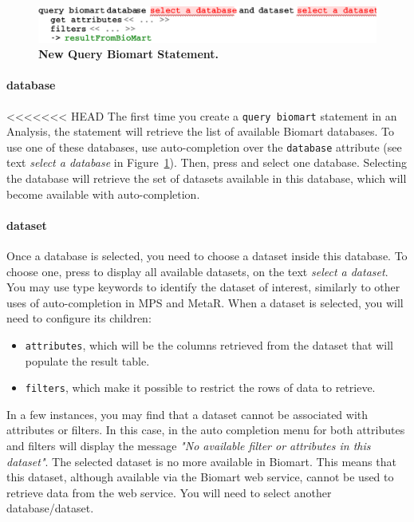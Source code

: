 \begin{itemize}
 \begin{figure}[h!tbp]
  \centering
  \includegraphics[width=\figWidthWide]{figures/NewBiomart.pdf}
\caption[New Query Biomart Statement.]{\textbf{New Query Biomart Statement.}}
\label{fig:NewBiomart}
\end{figure}


\paragraph{database}
<<<<<<< HEAD
The first time you create a \texttt{query biomart} statement in an Analysis, the statement will retrieve the list of available Biomart databases. To use one of these databases, use auto-completion over the \texttt{database} attribute (see  text \textit{select a database} in Figure~\ref{fig:NewBiomart}). Then, press \keys{\ctrl+\space} and select one database. Selecting the database will retrieve the set of datasets available in this database, which will become available with auto-completion.


 \paragraph{dataset} 
Once a database is selected, you need to choose a dataset inside this database. To choose one, press \keys{\ctrl+\space} to display all available datasets, on the text \textit{select a dataset}. You may use type keywords to identify the dataset of interest, similarly to other uses of auto-completion in MPS and MetaR. When a dataset is selected, you will need to configure its children:
\begin{itemize}

\item \texttt{attributes}, which will be the columns retrieved from the dataset that will populate the result table.
\item \texttt{filters}, which make it possible  to restrict the rows of data to retrieve.
\end{itemize}

\begin{remark}
In a few instances, you may find that a dataset cannot be associated with attributes or filters. In this case, in the auto completion menu for both attributes and filters will display the message \textit{"No available filter or attributes in this dataset"}. The selected dataset is no more available in Biomart. This means that this dataset, although available via the Biomart web service, cannot be used to retrieve data from the web service. You will need to select another database/dataset. 
\end{remark}


\end{itemize}
